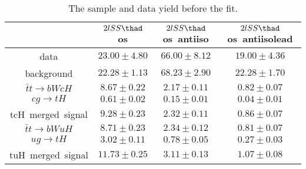 \begin{table}
\footnotesize
\caption{The sample and data yield before the fit.}
\centering
\begin{tabular}{|c|c|c|c|} \hline
 & $2lSS\thad$ os & $2lSS\thad$ os~antiiso & $2lSS\thad$ os~antiisolead\\\hline
data & $23.00\pm4.80$ & $66.00\pm8.12$ & $19.00\pm4.36$\\\hline
background & $22.28\pm1.13$ & $68.23\pm2.90$ & $22.28\pm1.70$\\\hline
$\bar{t}t\to bWcH$ & $8.67\pm0.22$ & $2.17\pm0.11$ & $0.82\pm0.07$\\\hline
$cg\to tH$ & $0.61\pm0.02$ & $0.15\pm0.01$ & $0.04\pm0.01$\\\hline
tcH~merged~signal & $9.28\pm0.23$ & $2.32\pm0.11$ & $0.86\pm0.07$\\\hline
$\bar{t}t\to bWuH$ & $8.71\pm0.23$ & $2.34\pm0.12$ & $0.81\pm0.07$\\\hline
$ug\to tH$ & $3.02\pm0.11$ & $0.78\pm0.05$ & $0.27\pm0.03$\\\hline
tuH~merged~signal & $11.73\pm0.25$ & $3.11\pm0.13$ & $1.07\pm0.08$\\\hline
\end{tabular}
\label{tab:yield}
\end{table}
